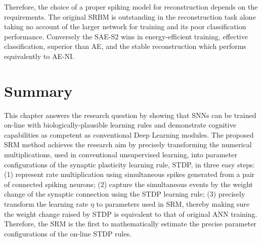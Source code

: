 Therefore, the choice of a proper spiking model for reconstruction depends on the requirements.
The original SRBM is outstanding in the reconstruction task alone taking no account of the larger network for training and its poor classification performance.
Conversely the SAE-S2 wins in energy-efficient training, effective classification, superior than AE, and the stable reconstruction which performs equivalently to AE-NI.


\section{Summary}
This chapter answers the research question by showing that SNNs can be trained on-line with biologically-plausible learning rules and demonstrate cognitive capabilities as competent as conventional Deep Learning modules.
The proposed SRM method achieves the research aim by precisely transforming the numerical multiplications, used in conventional unsupervised learning, into parameter configurations of the synaptic plasticity learning rule, STDP, in three easy steps:
(1) represent rate multiplication using simultaneous spikes generated from a pair of connected spiking neurons;
(2) capture the simultaneous events by the weight change of the synaptic connection using the STDP learning rule;
(3) precisely transform the learning rate $\eta$ to parameters used in SRM, thereby making sure the weight change raised by STDP is equivalent to that of original ANN training.
Therefore, the SRM is the first to mathematically estimate the precise parameter configurations of the on-line STDP rules.


